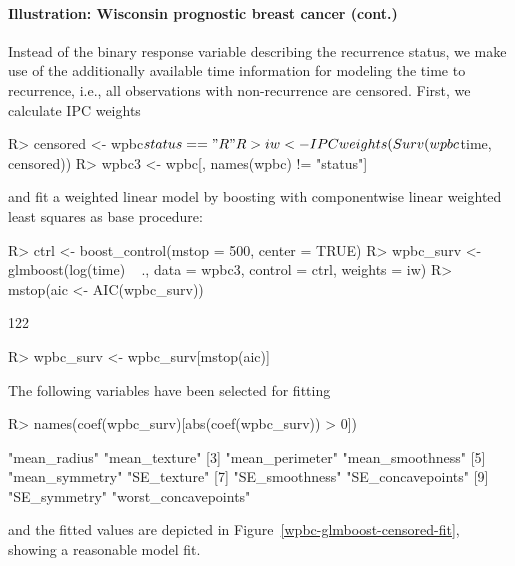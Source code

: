 \documentclass{article}
\newenvironment{Schunk}{}{}
\begin{document}
\paragraph{Illustration: Wisconsin prognostic breast cancer (cont.)}         


Instead of the binary response variable describing the recurrence status, we
make use of the additionally available time information for modeling
the time to recurrence, i.e., all observations with non-recurrence are censored.
First, we calculate IPC weights 
\begin{Schunk}
\begin{Sinput}
R> censored <- wpbc$status == "R"
R> iw <- IPCweights(Surv(wpbc$time, censored))
R> wpbc3 <- wpbc[, names(wpbc) != "status"]
\end{Sinput}
\end{Schunk}
and fit a weighted linear model by boosting with componentwise linear
weighted least squares as base procedure: 
\begin{Schunk}
\begin{Sinput}
R> ctrl <- boost_control(mstop = 500, center = TRUE)
R> wpbc_surv <- glmboost(log(time) ~ ., data = wpbc3, 
         control = ctrl, weights = iw)
R> mstop(aic <- AIC(wpbc_surv))
\end{Sinput}
\begin{Soutput}
[1] 122
\end{Soutput}
\begin{Sinput}
R> wpbc_surv <- wpbc_surv[mstop(aic)]
\end{Sinput}
\end{Schunk}
The following variables have been selected for fitting 
\begin{Schunk}
\begin{Sinput}
R> names(coef(wpbc_surv)[abs(coef(wpbc_surv)) > 0])
\end{Sinput}
\begin{Soutput}
 [1] "mean_radius"         "mean_texture"       
 [3] "mean_perimeter"      "mean_smoothness"    
 [5] "mean_symmetry"       "SE_texture"         
 [7] "SE_smoothness"       "SE_concavepoints"   
 [9] "SE_symmetry"         "worst_concavepoints"
\end{Soutput}
\end{Schunk}
and the fitted values are 
depicted in Figure~\ref{wpbc-glmboost-censored-fit}, showing a reasonable model fit.
\end{document}
